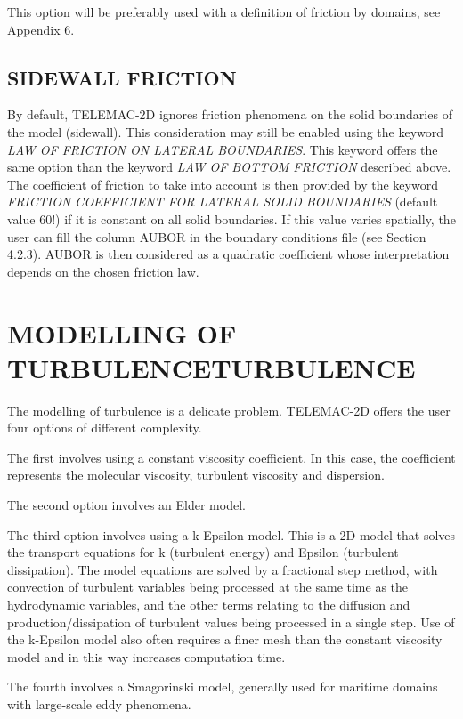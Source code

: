  This option will be preferably used with a definition of friction by domains, see Appendix 6.


\subsection{ SIDEWALL FRICTION}

 By default, TELEMAC-2D ignores friction phenomena on the solid boundaries of the model (sidewall). This consideration may still be enabled using the keyword \textit{LAW OF FRICTION ON LATERAL BOUNDARIES}.
This keyword offers the same option than the keyword \textit{LAW OF BOTTOM FRICTION} described above. The coefficient of friction to take into account is then provided by the keyword \textit{FRICTION COEFFICIENT FOR LATERAL SOLID BOUNDARIES} (default value 60!) if it is constant on all solid boundaries. If this value varies spatially, the user can fill the column AUBOR in the boundary conditions file (see Section 4.2.3). AUBOR is then considered as a quadratic coefficient whose interpretation depends on the chosen friction law.


\section{ MODELLING OF TURBULENCETURBULENCE}

 The modelling of turbulence is a delicate problem. TELEMAC-2D offers the user four options of different complexity.

 The first involves using a constant viscosity coefficient. In this case, the coefficient represents the molecular viscosity, turbulent viscosity and dispersion.

 The second option involves an Elder model.

 The third option involves using a k-Epsilon model. This is a 2D model that solves the transport equations for k (turbulent energy) and Epsilon (turbulent dissipation). The model equations are solved by a fractional step method, with convection of turbulent variables being processed at the same time as the hydrodynamic variables, and the other terms relating to the diffusion and production/dissipation of turbulent values being processed in a single step. Use of the k-Epsilon model also often requires a finer mesh than the constant viscosity model and in this way increases computation time.

 The fourth involves a Smagorinski model, generally used for maritime domains with large-scale eddy phenomena.

